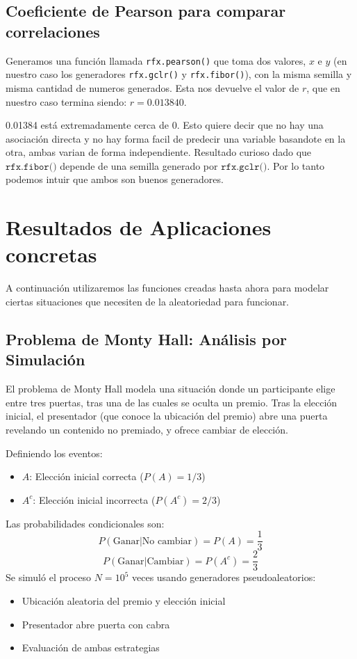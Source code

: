 \documentclass[baaa]{baaa}
\begin{document}
\subsection{Coeficiente de Pearson para comparar correlaciones}

Generamos una función llamada \texttt{rfx.pearson()} que toma dos valores, $x$ e $y$ (en nuestro caso los generadores \texttt{rfx.gclr()} y \texttt{rfx.fibor()}), con la misma semilla y misma cantidad de numeros generados. Esta nos devuelve el valor de $r$, que en nuestro caso termina siendo: $r=0.013840$.

0.01384 está extremadamente cerca de 0. Esto quiere decir que no hay una asociación directa y no hay forma facil de predecir una variable basandote en la otra, ambas varian de forma independiente. Resultado curioso dado que $\texttt{rfx.fibor()}$ depende de una semilla generado por $\texttt{rfx.gclr()}$. Por lo tanto podemos intuir que ambos son buenos generadores.

\section{Resultados de Aplicaciones concretas}

A continuación utilizaremos las funciones creadas hasta ahora para modelar ciertas situaciones que necesiten de la aleatoriedad para funcionar.

\subsection{Problema de Monty Hall: Análisis por Simulación}

El problema de Monty Hall modela una situación donde un participante elige entre tres puertas, tras una de las cuales se oculta un premio. Tras la elección inicial, el presentador (que conoce la ubicación del premio) abre una puerta revelando un contenido no premiado, y ofrece cambiar de elección.

Definiendo los eventos:
\begin{itemize}
    \item $A$: Elección inicial correcta ($P(A) = 1/3$)
    \item $A^c$: Elección inicial incorrecta ($P(A^c) = 2/3$)
\end{itemize}
Las probabilidades condicionales son:
\[
P(\text{Ganar}|\text{No cambiar}) = P(A) = \frac{1}{3}
\]
\[
P(\text{Ganar}|\text{Cambiar}) = P(A^c) = \frac{2}{3}
\]
Se simuló el proceso $N=10^5$ veces usando generadores pseudoaleatorios:
\begin{itemize}
    \item Ubicación aleatoria del premio y elección inicial
    \item Presentador abre puerta con cabra
    \item Evaluación de ambas estrategias
\end{itemize}
\end{document}
